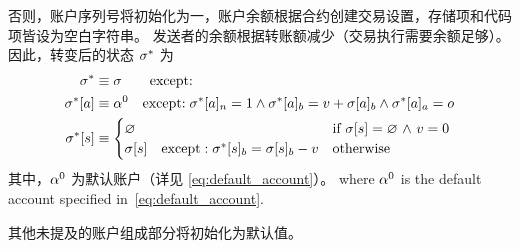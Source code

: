 否则，账户序列号将初始化为一，账户余额根据合约创建交易设置，存储项和代码项皆设为空白字符串。
发送者的余额根据转账额减少（交易执行需要余额足够）。
因此，转变后的状态 $\mathbf{\sigma}^*$ 为
\begin{align}
	\mathbf{\sigma}^* & \equiv \mathbf{\sigma} \qquad{ \text{except:}}\\
	\mathbf{\sigma}^*[a] &\equiv \mathbf{\alpha}^0 \quad\text{except:}\; \mathbf{\sigma}^*[a]_n=1 \wedge \mathbf{\sigma}^*[a]_b=v+\mathbf{\sigma}[a]_b \wedge \mathbf{\sigma}^*[a]_a=o\\
	\mathbf{\sigma}^*[s] &\equiv \begin{cases}
		\varnothing & \mbox{if $\mathbf{\sigma}[s]=\varnothing$ $\land$ $v=0$}\\
		\mathbf{\sigma}[s]\quad\mbox{except}:	\mathbf{\sigma}^*[s]_b=\mathbf{\sigma}[s]_b-v	& \mbox{otherwise}
	\end{cases}
\end{align}
其中，$\mathbf{\alpha}^0$ 为默认账户（详见 \cref{eq:default_account}）。
where $\mathbf{\alpha}^0$ is the default account specified in~\cref{eq:default_account}. 

其他未提及的账户组成部分将初始化为默认值。

